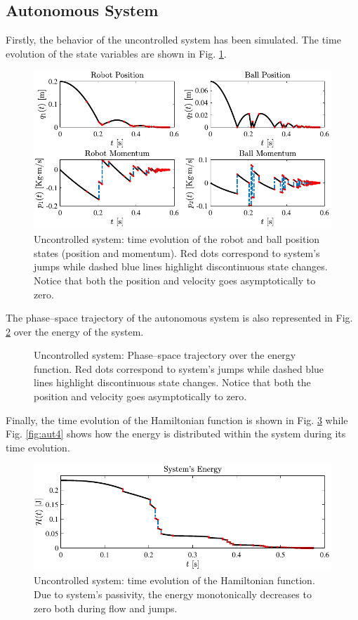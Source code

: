 \subsection{Autonomous System}
%
Firstly, the behavior of the uncontrolled system has been simulated. The time evolution of the state variables are shown in Fig. \ref{fig:aut1}.
%
\begin{figure}[h]
	\centering
	\includegraphics[width = \linewidth]{Figures/aut1.pdf}
	\caption[Uncontrolled system: time evolution of the robot and ball position states]{Uncontrolled system: time evolution of the robot and ball position states (position and momentum). Red dots correspond to system's jumps while dashed blue lines highlight discontinuous state changes. Notice that both the position and velocity goes asymptotically to zero.}
	\label{fig:aut1}
\end{figure}
%
The phase--space trajectory of the autonomous system is also represented in Fig. \ref{fig:aut2} over the energy of the system. 
%
\begin{figure}[h]
	\centering
	\caption[Uncontrolled system: Phase--space trajectory over the energy function]{Uncontrolled system: Phase--space trajectory over the energy function. Red dots correspond to system's jumps while dashed blue lines highlight discontinuous state changes. Notice that both the position and velocity goes asymptotically to zero.}
	\label{fig:aut2}
\end{figure}
%
Finally, the time evolution of the Hamiltonian function is shown in Fig. \ref{fig:aut3} while Fig. \ref{fig:aut4} shows how the energy is distributed within the system during its time evolution.
%
\begin{figure}[h]
	\centering
	\includegraphics[width=\linewidth]{Figures/aut3.pdf}
	\caption[Uncontrolled system: time evolution of the Hamiltonian function.]{Uncontrolled system: time evolution of the Hamiltonian function. Due to system's passivity, the energy monotonically decreases to zero both during flow and jumps.}
	\label{fig:aut3}
\end{figure}
